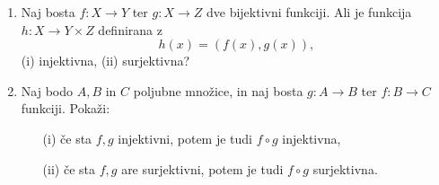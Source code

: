 \documentclass[11pt,paper=b5,footinclude,headinclude]{scrbook} %
\begin{document}
\begin{enumerate}
\item Naj bosta $f\colon X \to Y$ ter $g\colon X\to Z$ dve bijektivni funkciji. Ali je funkcija  $h\colon X \to Y \times Z$ definirana z 
$$h(x) = (f(x),g(x)),$$
(i) injektivna, (ii) surjektivna?
\item Naj bodo $A, B$ in $C$ poljubne množice,
 in naj bosta $g\colon A\to B$ ter $f\colon B\to C$  funkciji. Pokaži:
\begin{enumerate}
\item[(i)] če sta $f, g$  injektivni, potem je tudi $f\circ g$  injektivna,
\item[(ii)] če sta $f, g$ are surjektivni, potem je tudi $f\circ g$  surjektivna.
\end{enumerate}



\end{enumerate}
\end{document}
